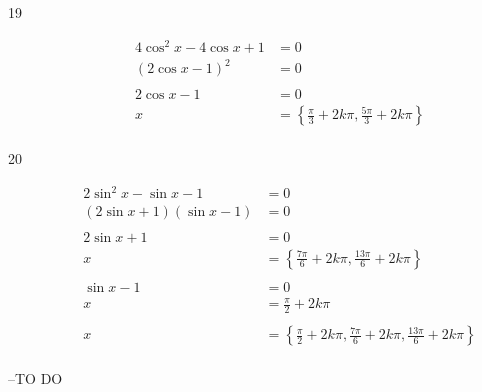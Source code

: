\documentclass{exam}
\begin{document}
\begin{description}
      \item[19] 
        \begin{align*}
          4 \cos^2 x - 4 \cos x + 1 & = 0 \\
          (2 \cos x - 1)^2 & = 0 \\
          \\
          2 \cos x - 1 & = 0 \\
          x            & = \boxed{ \left\{ \frac{\pi}{3} + 2k \pi, \frac{5 \pi}{3} + 2k \pi \right\} } \\
        \end{align*}

      \item[20] 
        \begin{align*}
          2 \sin^2 x - \sin x - 1 & = 0 \\
          (2 \sin x + 1) (\sin x - 1) & = 0 \\
          \\
          2 \sin x + 1 & = 0 \\
          x            & = \left\{ \frac{7 \pi}{6} + 2k \pi, \frac{13 \pi}{6} + 2k \pi \right\} \\
          \\
          \sin x - 1 & = 0 \\
          x          & = \frac{\pi}{2} + 2k \pi \\
          \\
          x & = \boxed{ \left\{ \frac{\pi}{2} + 2k \pi, \frac{7 \pi}{6} + 2k \pi, \frac{13 \pi}{6} + 2k \pi \right\} } \\
        \end{align*}

    \end{description}

  \else
    \vspace{5 cm}

    \begin{quote}
      \begin{em}
      \end{em}
    \end{quote}
    \hspace{1 cm} --TO DO
  \fi
\end{document}
